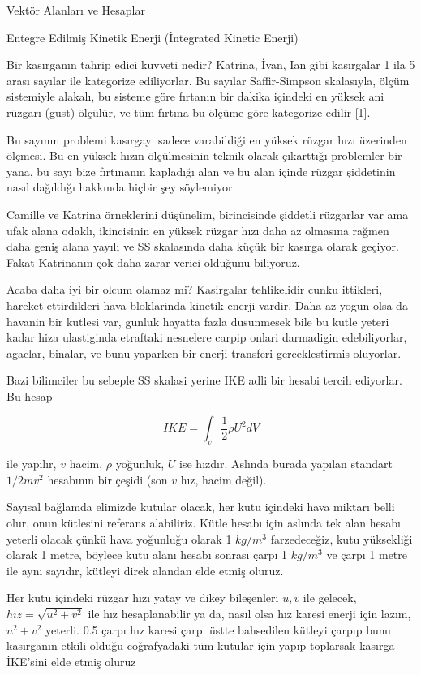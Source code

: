 \documentclass[12pt,fleqn]{article}\usepackage{../../common}
\begin{document}
Vektör Alanları ve Hesaplar

Entegre Edilmiş Kinetik Enerji (İntegrated Kinetic Enerji)

Bir kasırganın tahrip edici kuvveti nedir? Katrina, İvan, Ian gibi kasırgalar 1
ila 5 arası sayılar ile kategorize ediliyorlar. Bu sayılar Saffir-Simpson
skalasıyla, ölçüm sistemiyle alakalı, bu sisteme göre fırtanın bir dakika
içindeki en yüksek ani rüzgarı (gust) ölçülür, ve tüm fırtına bu ölçüme göre
kategorize edilir [1].

Bu sayının problemi kasırgayı sadece varabildiği en yüksek rüzgar hızı üzerinden
ölçmesi. Bu en yüksek hızın ölçülmesinin teknik olarak çıkarttığı problemler bir
yana, bu sayı bize fırtınanın kapladığı alan ve bu alan içinde rüzgar şiddetinin
nasıl dağıldığı hakkında hiçbir şey söylemiyor.

Camille ve Katrina örneklerini düşünelim, birincisinde şiddetli rüzgarlar var
ama ufak alana odaklı, ikincisinin en yüksek rüzgar hızı daha az olmasına rağmen
daha geniş alana yayılı ve SS skalasında daha küçük bir kasırga olarak geçiyor.
Fakat Katrinanın çok daha zarar verici olduğunu biliyoruz.

Acaba daha iyi bir olcum olamaz mi? Kasirgalar tehlikelidir cunku ittikleri,
hareket ettirdikleri hava bloklarinda kinetik enerji vardir. Daha az yogun olsa
da havanin bir kutlesi var, gunluk hayatta fazla dusunmesek bile bu kutle yeteri
kadar hiza ulastiginda etraftaki nesnelere carpip onlari darmadigin
edebiliyorlar, agaclar, binalar, ve bunu yaparken bir enerji transferi
gerceklestirmis oluyorlar.

Bazi bilimciler bu sebeple SS skalasi yerine IKE adli bir hesabi tercih
ediyorlar. Bu hesap

$$
IKE = \int_v \frac{1}{2} \rho U^2 dV
$$

ile yapılır, $v$ hacim, $\rho$ yoğunluk, $U$ ise hızdır. Aslında burada yapılan
standart $1/2 m v^2$ hesabının bir çeşidi (son $v$ hız, hacim değil).

Sayısal bağlamda elimizde kutular olacak, her kutu içindeki hava miktarı belli
olur, onun kütlesini referans alabiliriz. Kütle hesabı için aslında tek alan
hesabı yeterli olacak çünkü hava yoğunluğu olarak 1 $kg/m^3$ farzedeceğiz, kutu
yüksekliği olarak 1 metre, böylece kutu alanı hesabı sonrası çarpı 1 $kg/m^3$ ve
çarpı 1 metre ile aynı sayıdır, kütleyi direk alandan elde etmiş oluruz.

Her kutu içindeki rüzgar hızı yatay ve dikey bileşenleri $u,v$ ile gelecek, $hız
= \sqrt{u^2+v^2}$ ile hız hesaplanabilir ya da, nasıl olsa hız karesi enerji
için lazım, $u^2+v^2$ yeterli. 0.5 çarpı hız karesi çarpı üstte bahsedilen
kütleyi çarpıp bunu kasırganın etkili olduğu coğrafyadaki tüm kutular için
yapıp toplarsak kasırga İKE'sini elde etmiş oluruz 
\end{document}
